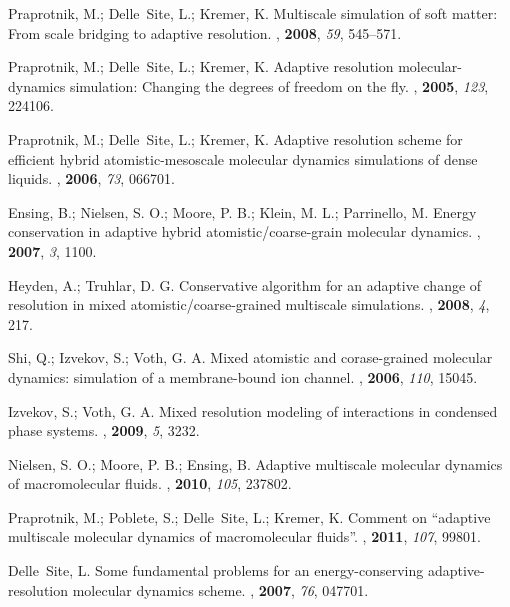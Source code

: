 \documentclass[aps,prb,preprint,citeautoscript]{revtex4}
\begin{document}
\begin{thebibliography}{10}

Praprotnik, M.; Delle~Site, L.; Kremer, K.
\newblock Multiscale simulation of soft matter: From scale bridging to adaptive
  resolution.
, \textbf{2008}, \textit{59}, 545--571.

Praprotnik, M.; Delle~Site, L.; Kremer, K.
\newblock Adaptive resolution molecular-dynamics simulation: Changing the
  degrees of freedom on the fly.
, \textbf{2005}, \textit{123}, 224106.

Praprotnik, M.; Delle~Site, L.; Kremer, K.
\newblock Adaptive resolution scheme for efficient hybrid atomistic-mesoscale
  molecular dynamics simulations of dense liquids.
, \textbf{2006}, \textit{73}, 066701.

Ensing, B.; Nielsen, S. O.; Moore, P. B.; Klein, M. L.; Parrinello, M.
\newblock Energy conservation in adaptive hybrid atomistic/coarse-grain
  molecular dynamics.
, \textbf{2007}, \textit{3}, 1100.

Heyden, A.; Truhlar, D. G.
\newblock Conservative algorithm for an adaptive change of resolution in mixed
  atomistic/coarse-grained multiscale simulations.
, \textbf{2008}, \textit{4}, 217.

Shi, Q.; Izvekov, S.; Voth, G. A.
\newblock Mixed atomistic and corase-grained molecular dynamics: simulation of
  a membrane-bound ion channel.
, \textbf{2006}, \textit{110}, 15045.

Izvekov, S.; Voth, G. A.
\newblock Mixed resolution modeling of interactions in condensed phase systems.
, \textbf{2009}, \textit{5}, 3232.

Nielsen, S. O.; Moore, P. B.; Ensing, B.
\newblock Adaptive multiscale molecular dynamics of macromolecular fluids.
, \textbf{2010}, \textit{105}, 237802.

Praprotnik, M.; Poblete, S.; Delle~Site, L.; Kremer, K.
\newblock Comment on “adaptive multiscale molecular dynamics of
  macromolecular fluids”.
, \textbf{2011}, \textit{107}, 99801.

Delle~Site, L.
\newblock Some fundamental problems for an energy-conserving
  adaptive-resolution molecular dynamics scheme.
, \textbf{2007}, \textit{76}, 047701.


\end{thebibliography}
\end{document}
